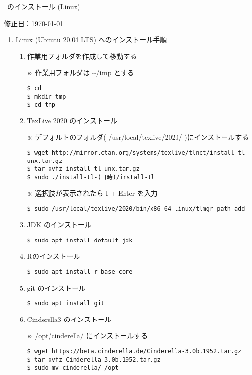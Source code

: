 \documentclass{ujarticle}
\begin{document}
\begin{center}
\ketcindy\ のインストール (Linux)
\end{center}

\hfill 修正日：\today

\begin{enumerate}[\bf\large 1.]
\item Linux (Ubnutu 20.04 LTS) へのインストール手順

\begin{enumerate}[(1)]

\item 作業用フォルダを作成して移動する

※ 作業用フォルダは \textasciitilde/tmp とする

\begin{verbatim}
$ cd
$ mkdir tmp
$ cd tmp
\end{verbatim}

\item TexLive 2020 のインストール

※ デフォルトのフォルダ( /usr/local/texlive/2020/ )にインストールする

\begin{verbatim}
$ wget http://mirror.ctan.org/systems/texlive/tlnet/install-tl-unx.tar.gz
$ tar xvfz install-tl-unx.tar.gz
$ sudo ./install-tl-(日時)/install-tl
\end{verbatim}

※ 選択肢が表示されたら I + Enter を入力

\verb|$ sudo /usr/local/texlive/2020/bin/x86_64-linux/tlmgr path add|

\item JDK のインストール

\verb|$ sudo apt install default-jdk|

\item Rのインストール

\verb|$ sudo apt install r-base-core|

\item git のインストール

\verb|$ sudo apt install git|

\item Cinderella3 のインストール

※ /opt/cinderella/ にインストールする

\begin{verbatim}
$ wget https://beta.cinderella.de/Cinderella-3.0b.1952.tar.gz
$ tar xvfz Cinderella-3.0b.1952.tar.gz
$ sudo mv cinderella/ /opt
\end{verbatim}


\end{enumerate}
\end{enumerate}
\end{document}
